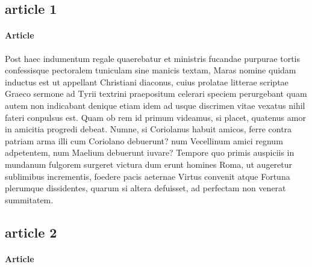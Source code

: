 \documentclass[a4paper,11pt]{report}
\begin{document}
\subsection{article 1}
\paragraph{Article}Post haec indumentum regale quaerebatur et ministris fucandae purpurae tortis confessisque pectoralem tuniculam sine manicis textam, Maras nomine quidam inductus est ut appellant Christiani diaconus, cuius prolatae litterae scriptae Graeco sermone ad Tyrii textrini praepositum celerari speciem perurgebant quam autem non indicabant denique etiam idem ad usque discrimen vitae vexatus nihil fateri conpulsus est.
Quam ob rem id primum videamus, si placet, quatenus amor in amicitia progredi debeat. Numne, si Coriolanus habuit amicos, ferre contra patriam arma illi cum Coriolano debuerunt? num Vecellinum amici regnum adpetentem, num Maelium debuerunt iuvare?
Tempore quo primis auspiciis in mundanum fulgorem surgeret victura dum erunt homines Roma, ut augeretur sublimibus incrementis, foedere pacis aeternae Virtus convenit atque Fortuna plerumque dissidentes, quarum si altera defuisset, ad perfectam non venerat summitatem.
\subsection{article 2}
\paragraph{Article}
\end{document}
